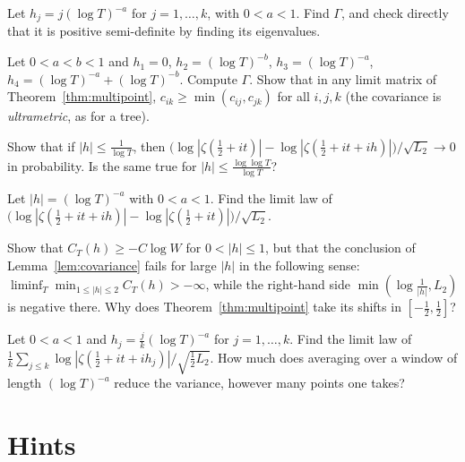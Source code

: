 \begin{exercise}[$\star$]\label{ex:equicorr}
Let $h_j=j(\log T)^{-a}$ for $j=1,\dots,k$, with $0<a<1$. Find $\Gamma$, and check directly that it is positive semi-definite by finding its eigenvalues.
\end{exercise}

\begin{exercise}[$\star\star$]\label{ex:ultrametric}
Let $0<a<b<1$ and $h_1=0$, $h_2=(\log T)^{-b}$, $h_3=(\log T)^{-a}$, $h_4=(\log T)^{-a}+(\log T)^{-b}$. Compute $\Gamma$. Show that in any limit matrix of Theorem~\ref{thm:multipoint}, $c_{ik}\ge\min(c_{ij},c_{jk})$ for all $i,j,k$ (the covariance is \emph{ultrametric}, as for a tree).
\end{exercise}

\begin{exercise}[$\star$]\label{ex:closepoints}
Show that if $|h|\le\frac1{\log T}$, then $\bigl(\log|\zeta(\frac12+it)|-\log|\zeta(\frac12+it+ih)|\bigr)/\sqrt{L_2}\to0$ in probability. Is the same true for $|h|\le\frac{\log\log T}{\log T}$?
\end{exercise}

\begin{exercise}[$\star\star$]\label{ex:increment}
Let $|h|=(\log T)^{-a}$ with $0<a<1$. Find the limit law of $\bigl(\log|\zeta(\frac12+it+ih)|-\log|\zeta(\frac12+it)|\bigr)/\sqrt{L_2}$.
\end{exercise}

\begin{exercise}[$\star\star$]\label{ex:negcov}
Show that $C_T(h)\ge-C\log W$ for $0<|h|\le1$, but that the conclusion of Lemma~\ref{lem:covariance} fails for large $|h|$ in the following sense: $\liminf_{T}\min_{1\le|h|\le2}C_T(h)>-\infty$, while the right-hand side $\min(\log\frac1{|h|},L_2)$ is negative there. Why does Theorem~\ref{thm:multipoint} take its shifts in $[-\frac12,\frac12]$?
\end{exercise}

\begin{exercise}[$\star$]\label{ex:smoothing}
Let $0<a<1$ and $h_j=\frac jk(\log T)^{-a}$ for $j=1,\dots,k$. Find the limit law of $\frac1k\sum_{j\le k}\log|\zeta(\frac12+it+ih_j)|/\sqrt{\frac12L_2}$. How much does averaging over a window of length $(\log T)^{-a}$ reduce the variance, however many points one takes?
\end{exercise}

\section{Hints}

